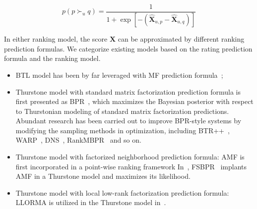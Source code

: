 \documentclass[letterpaper]{article} %
\newcommand{\Rating}{\mathbf{X}}
\begin{document}
\begin{equation}
p(p\succ_u q) = \frac{1} {1+\exp[-(\hat{\Rating}_{u,p}-\hat{\Rating}_{u,q})]}
\end{equation}

In either ranking model, the score $\hat{\Rating}$ can be approximated by different ranking prediction formulas. We categorize existing models based on the rating prediction formula and the ranking model. 
\begin{itemize}
\item BTL model has been by far leveraged with MF prediction formula~\cite{Hu2016Improved};
\item Thurstone model with standard matrix factorization prediction formula is first presented as BPR~\cite{Rendle2009BPR}, which maximizes the Bayesian posterior with respect to Thurstonian modeling of standard matrix factorization predictions. Abundant research has been carried out to improve BPR-style systems by modifying the sampling methods in optimization, including BTR++~\cite{Lerche2014Using}, WARP~\cite{Weston2011Wsabie}, DNS~\cite{Zhang2013Optimizing}, RankMBPR~\cite{Yu2016RankMBPR} and so on.
\item Thurstone model with factorized neighborhood prediction formula: AMF is first incorporated in a point-wise ranking framework In~\cite{Steck2015Gaussian},  FSBPR~\cite{Zhao2018Factored} implants AMF in a Thurstone model and maximizes its likelihood.
\item Thurstone model with local low-rank factorization prediction formula: LLORMA is utilized in the Thurstone model in~\cite{Lee2014Local}.
 \end{itemize}

 



\end{document}
